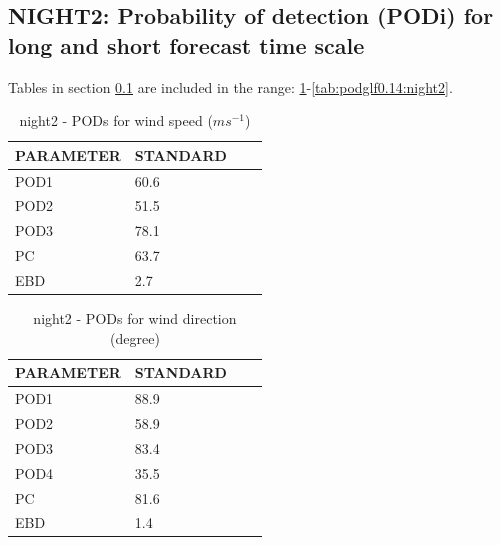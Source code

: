 \subsection{NIGHT2: Probability of detection (PODi) for long and short forecast time scale}\label{subsec:night2:pod}
Tables in section \ref{subsec:night2:pod} are included in the range: \ref{tab:podws:night2}-\ref{tab:podglf0.14:night2}.
\begin{table}[h!]
\begin{center}
\begin{tabular}{|l|l|l|l|}
\hline
\multicolumn{1}{|c|}{\cellcolor[HTML]{C0C0C0}\textbf{PARAMETER}} & \multicolumn{1}{c|}{\cellcolor[HTML]{C0C0C0}\textbf{STANDARD}} \\
\hline
\cellcolor[HTML]{C0C0C0}POD1  & 60.6                                \\
\cellcolor[HTML]{C0C0C0}POD2  & 51.5                                \\
\cellcolor[HTML]{C0C0C0}POD3  & 78.1                                \\
\cellcolor[HTML]{C0C0C0}PC    & 63.7                                  \\
\cellcolor[HTML]{C0C0C0}EBD   & 2.7                                 \\
\hline
\end{tabular}
\caption{night2 - PODs for wind speed ($m s^{-1}$)}
\label{tab:podws:night2}
\end{center}
\end{table}
\begin{table}[p!]
\begin{center}
\begin{tabular}{|l|l|l|l|}
\hline
\multicolumn{1}{|c|}{\cellcolor[HTML]{C0C0C0}\textbf{PARAMETER}} & \multicolumn{1}{c|}{\cellcolor[HTML]{C0C0C0}\textbf{STANDARD}}\\
\hline
\cellcolor[HTML]{C0C0C0}POD1  & 88.9      \\
\cellcolor[HTML]{C0C0C0}POD2  & 58.9      \\
\cellcolor[HTML]{C0C0C0}POD3  & 83.4      \\
\cellcolor[HTML]{C0C0C0}POD4  & 35.5      \\
\cellcolor[HTML]{C0C0C0}PC    & 81.6        \\
\cellcolor[HTML]{C0C0C0}EBD   & 1.4       \\
\hline
\end{tabular}
\caption{night2 - PODs for wind direction (degree)}
\label{tab:podwd:night2}
\end{center}
\end{table}
